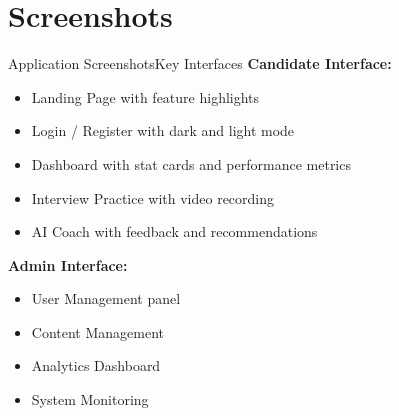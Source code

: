 \documentclass{beamer}
\begin{document}
\section{Screenshots}
\begin{frame}{Application Screenshots}{Key Interfaces}
\textbf{Candidate Interface:}
\begin{itemize}
    \item Landing Page with feature highlights
    \item Login / Register with dark and light mode
    \item Dashboard with stat cards and performance metrics
    \item Interview Practice with video recording
    \item AI Coach with feedback and recommendations
\end{itemize}

\vspace{3pt}
\textbf{Admin Interface:}
\begin{itemize}
    \item User Management panel
    \item Content Management
    \item Analytics Dashboard
    \item System Monitoring
\end{itemize}
\end{frame}

\end{document}
